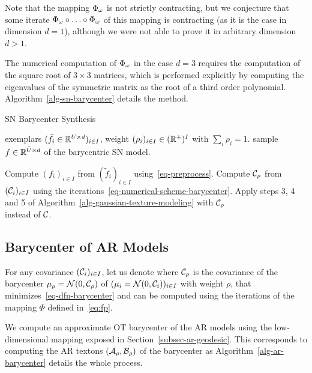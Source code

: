 Note that the mapping $\Phi_\omega$ is not strictly contracting, but we conjecture that some iterate $\Phi_\omega \circ \ldots \circ \Phi_\omega$ of this mapping is contracting (as it is the case in dimension $d=1$), although we were not able to prove it in arbitrary dimension $d>1$.

The numerical computation of $\Phi_\omega$ in the case $d=3$ requires the computation of the square root of $3 \times 3$ matrices, which is performed explicitly by computing the eigenvalues of the symmetric matrix as the root of a third order polynomial. Algorithm~\ref{alg-sn-barycenter} details the method.

\begin{algorithm}[ht!]
\caption{SN Barycenter Synthesis}
\label{alg-sn-barycenter}
\Require exemplars $(\tilde f_i \in \mathbb{R}^{U \times d})_{i \in I}$, weight $(\rho_{i})_{i \in I} \in (\mathbb{R}^+)^{I}$ with $\sum_i \rho_i=1$.
\Ensure sample $f \in \mathbb{R}^{\tilde {U} \times d}$ of the barycentric SN model.
\begin{enumerate}
	 Compute $(f_i)_{i \in I}$ from $(\tilde f_i)_{i \in I}$
			using~\eqref{eq-preprocess}.
	 Compute $\mathcal{C}_\rho$ from $(\mathcal{C}_i)_{i \in I}$ using the iterations~\eqref{eq-numerical-scheme-barycenter}.
	 Apply steps 3, 4 and 5 of Algorithm~\ref{alg-gaussian-texture-modeling}
		with $\mathcal{C}_\rho$ \\ instead of $\mathcal{C}$.
\end{enumerate}
\end{algorithm}


\subsection{Barycenter of AR Models}

For any covariance $(\mathcal{C}_i)_{i \in I}$, let us denote
where $\mathcal{C}_\rho$ is the covariance of the barycenter $\mu_\rho=\mathcal{N}(0,\mathcal{C}_\rho)$ of $(\mu_i=\mathcal{N}(0,\mathcal{C}_i))_{i \in I}$ with weight $\rho$, that minimizes~\eqref{eq-dfn-barycenter} and can be computed using the iterations of the mapping $\Phi$ defined in~\eqref{eq:fp}.

We compute an approximate OT barycenter of the AR models using the low-dimensional mapping exposed in Section~\ref{subsec-ar-geodesic}. This corresponds to computing the AR textons $(\mathcal{A}_\rho,\mathcal{B}_\rho)$ of the barycenter as
Algorithm~\ref{alg-ar-barycenter} details the whole process.

